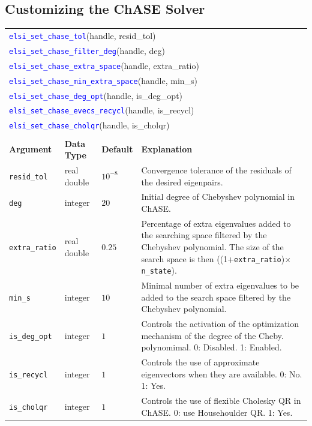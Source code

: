 \documentclass{report}
\newcommand{\api}[1]{\textcolor{blue}{\texttt{#1}}}
\begin{document}
\subsection{Customizing the ChASE Solver}
\label{subsec:setter_chase}
\begin{tabular}[]{|p{30mm}|p{20mm}|p{15mm}|p{97mm}|}
	\multicolumn{4}{l}{\api{elsi\_set\_chase\_tol}(handle, resid\_tol)}\\
	\multicolumn{4}{l}{\api{elsi\_set\_chase\_filter\_deg}(handle, deg)}\\
	\multicolumn{4}{l}{\api{elsi\_set\_chase\_extra\_space}(handle, extra\_ratio)}\\
	\multicolumn{4}{l}{\api{elsi\_set\_chase\_min\_extra\_space}(handle, min\_s)}\\
	\multicolumn{4}{l}{\api{elsi\_set\_chase\_deg\_opt}(handle, is\_deg\_opt)}\\
	\multicolumn{4}{l}{\api{elsi\_set\_chase\_evecs\_recycl}(handle, is\_recycl)}\\
	\multicolumn{4}{l}{\api{elsi\_set\_chase\_cholqr}(handle, is\_cholqr)}\\
	\multicolumn{4}{l}{}\\
	\hline
	\multicolumn{1}{|l|}{\textbf{Argument}} & \multicolumn{1}{l|}{\textbf{Data Type}} & \multicolumn{1}{l|}{\textbf{Default}} & \multicolumn{1}{l|}{\textbf{Explanation}}\\
	\hline
	\texttt{resid\_tol} & real double &  $10^{-8}$ & Convergence tolerance of the residuals of the desired eigenpairs.\\
	\hline
	\texttt{deg} & integer &  $20$ &  Initial degree of Chebyshev polynomial in ChASE. \\
    \hline
	\texttt{extra\_ratio} & real double &  $0.25$ & Percentage of extra eigenvalues added to the
                                                        searching space filtered by the Chebyshev polynomial. The size of the
                                                        search space is then ((1+\texttt{extra\_ratio})$\times$ \texttt{n\_state}). \\
	\hline
	\texttt{min\_s} & integer &  $10$ & Minimal number of extra eigenvalues to be added to
                                            the search space filtered by the Chebyshev polynomial. \\
	\hline
	\texttt{is\_deg\_opt} & integer &  $1$ &  Controls the activation of the optimization
                                                 mechanism of the degree of the Cheby. polynomimal. 0: Disabled. 1: Enabled. \\
	\hline
	\texttt{is\_recycl} & integer &  $1$ &  Controls the use of approximate eigenvectors when they are available. 0: No. 1: Yes. \\
	\hline
	\texttt{is\_cholqr} & integer &  $1$ &  Controls the use of flexible Cholesky QR in ChASE. 0: use Househoulder QR. 1: Yes. \\
\hline
\end{tabular}
\end{document}
